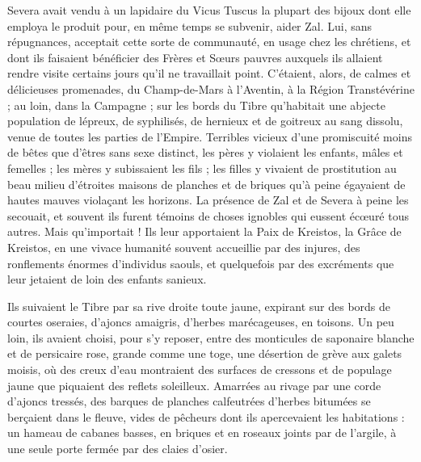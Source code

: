 \documentclass[a4paper, 11pt, oneside, polutonikogreek, french]{article}
\begin{document}
Severa avait vendu à un lapidaire du Vicus Tuscus la plupart des bijoux dont elle employa le produit pour, en même temps se subvenir, aider Zal. Lui, sans répugnances, acceptait cette sorte de communauté, en usage chez les chrétiens, et dont ils faisaient bénéficier des Frères et Sœurs pauvres auxquels ils allaient rendre visite certains jours qu'il ne travaillait point. C'étaient, alors, de calmes et délicieuses promenades, du Champ-de-Mars à l'Aventin, à la Région Transtévérine ; au loin, dans la Campagne ; sur les bords du Tibre qu'habitait une abjecte population de lépreux, de syphilisés, de hernieux et de goitreux au sang dissolu, venue de toutes les parties de l'Empire. Terribles vicieux d'une promiscuité moins de bêtes que d'êtres sans sexe distinct, les pères y violaient les enfants, mâles et femelles ; les mères y subissaient les fils ; les filles y vivaient de prostitution au beau milieu d'étroites maisons de planches et de briques qu'à peine égayaient de hautes mauves violaçant les horizons. La présence de Zal et de Severa à peine les secouait, et souvent ils furent témoins de choses ignobles qui eussent écœuré tous autres. Mais qu'importait ! Ils leur apportaient la Paix de Kreistos, la Grâce de Kreistos, en une vivace humanité souvent accueillie par des injures, des ronflements énormes d'individus saouls, et quelquefois par des excréments que leur jetaient de loin des enfants sanieux.

Ils suivaient le Tibre par sa rive droite toute jaune, expirant sur des bords de courtes oseraies, d'ajoncs amaigris, d'herbes marécageuses, en toisons. Un peu loin, ils avaient choisi, pour s'y reposer, entre des monticules de saponaire blanche et de persicaire rose, grande comme une toge, une désertion de grève aux galets moisis, où des creux d'eau montraient des surfaces de cressons et de populage jaune que piquaient des reflets soleilleux. Amarrées au rivage par une corde d'ajoncs tressés, des barques de planches calfeutrées d'herbes bitumées se berçaient dans le fleuve, vides de pêcheurs dont ils apercevaient les habitations : un hameau de cabanes basses, en briques et en roseaux joints par de l'argile, à une seule porte fermée par des claies d'osier.
\clearpage
\subsection{}
\end{document}
